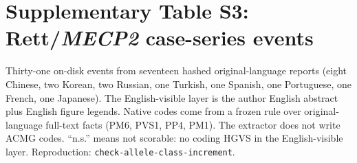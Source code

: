 \documentclass[12pt]{article}
\begin{document}
\clearpage

\section*{Supplementary Table S3: Rett/\textit{MECP2} case-series events}

Thirty-one on-disk events from seventeen hashed original-language reports
(eight Chinese, two Korean, two Russian, one Turkish, one Spanish, one
Portuguese, one French, one Japanese). The English-visible layer is the author English
abstract plus English figure legends. Native codes come
from a frozen rule over original-language full-text facts (PM6, PVS1,
PP4, PM1). The extractor does not write ACMG codes. ``n.s.'' means not
scorable: no coding HGVS in the English-visible layer. Reproduction:
\texttt{check-allele-class-increment}.
\end{document}
